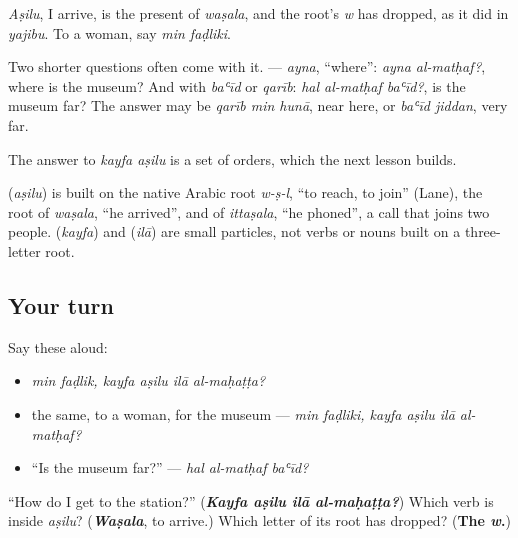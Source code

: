 \emph{Aṣilu}, I arrive, is the present of \emph{waṣala}, and the root's \emph{w} has dropped, as it did in \emph{yajibu}. To a woman, say \emph{min faḍliki}.

\begin{grammarlens}[title={Grammar Lens: the questions around it}]
Two shorter questions often come with it. \textbf{} — \emph{ayna}, \textquotedblleft{}where\textquotedblright{}: \emph{ayna al-matḥaf?}, where is the museum? And \textbf{} with \emph{baʿīd} or \emph{qarīb}: \emph{hal al-matḥaf baʿīd?}, is the museum far? The answer may be \emph{qarīb min hunā}, near here, or \emph{baʿīd jiddan}, very far.

The answer to \emph{kayfa aṣilu} is a set of orders, which the next lesson builds.
\end{grammarlens}

\begin{cousinweb}
\textbf{} (\emph{aṣilu}) is built on the native Arabic root \emph{w-ṣ-l}, \textquotedblleft{}to reach, to join\textquotedblright{} (Lane), the root of \emph{waṣala}, \textquotedblleft{}he arrived\textquotedblright{}, and of \emph{ittaṣala}, \textquotedblleft{}he phoned\textquotedblright{}, a call that joins two people. \textbf{} (\emph{kayfa}) and \textbf{} (\emph{ilā}) are small particles, not verbs or nouns built on a three-letter root.
\end{cousinweb}

\subsection*{Your turn}
Say these aloud:

\begin{itemize}
\raggedright
  \item \emph{min faḍlik, kayfa aṣilu ilā al-maḥaṭṭa?}
  \item the same, to a woman, for the museum — \emph{min faḍliki, kayfa aṣilu ilā al-matḥaf?}
  \item \textquotedblleft{}Is the museum far?\textquotedblright{} — \emph{hal al-matḥaf baʿīd?}
\end{itemize}

\begin{tcolorbox}[breakable,colback=teal!4,colframe=teal!35!black,title={Before you move on}]
\textquotedblleft{}How do I get to the station?\textquotedblright{} (\emph{\textbf{Kayfa aṣilu ilā al-maḥaṭṭa?}}) Which verb is inside \emph{aṣilu}? (\emph{\textbf{Waṣala}}, to arrive.) Which letter of its root has dropped? (\textbf{The \emph{w}.})
\end{tcolorbox}
